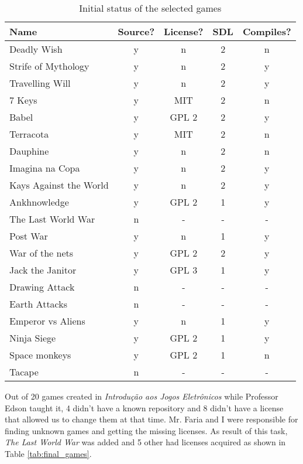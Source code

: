 \begin{table}[h!]
\centering
\caption{Initial status of the selected games}
\label{tab:first_games}
\begin{tabular}{lcccc}
\toprule
\textbf{Name} & \textbf{Source?} & \textbf{License?} & \textbf{SDL} & \textbf{Compiles?} \\
\midrule
Deadly Wish & y & n & 2 & n \\
Strife of Mythology & y & n & 2 & y \\
Travelling Will & y & n & 2 & y \\
7 Keys & y & MIT & 2 & n \\
Babel & y & GPL 2 & 2 & y \\
Terracota & y & MIT & 2 & n \\
Dauphine & y & n & 2 & n \\
Imagina na Copa & y & n & 2 & y \\
Kays Against the World & y & n & 2 & y \\
Ankhnowledge & y & GPL 2 & 1 & y \\
The Last World War & n & - & - & - \\
Post War & y & n & 1 & y \\
War of the nets & y & GPL 2 & 2 & y \\
Jack the Janitor & y & GPL 3 & 1 & y \\
Drawing Attack & n & - & - & - \\
Earth Attacks & n & - & - & - \\
Emperor vs Aliens & y & n & 1 & y \\
Ninja Siege & y & GPL 2 & 1 & y \\
Space monkeys & y & GPL 2 & 1 & n \\
Tacape & n & - & - & - \\
\bottomrule
\end{tabular}
\end{table}

Out of 20 games created in \textit{Introdu\c{c}\~ao aos Jogos Eletr\^onicos} while Professor Edson taught it, 4 didn't have a known repository and 8 didn't have a license that allowed us to change them at that time. Mr. Faria and I were responsible for finding unknown games and getting the missing licenses. As result of this task, \textit{The Last World War} was added and 5 other had licenses acquired as shown in Table \ref{tab:final_games}.

